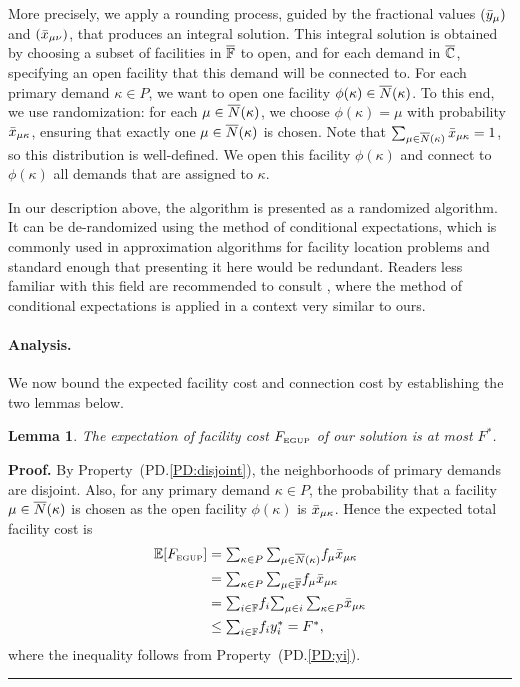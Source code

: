 \documentclass[oneside,final]{ucr}
\newtheorem{lemma}[theorem]{Lemma}
\newenvironment{proof}[1][Proof]{\textbf{#1.} }{\ \rule{0.5em}{0.5em}}
\begin{document}
More precisely, we apply a rounding process, guided by the
fractional values $({\bar y}_{\mu})$ and $({\bar x}_{\mu\nu})$,
that produces an integral solution. This integral solution
is obtained by choosing a subset of facilities in
$\overline{\mathbb{F}}$ to open, and for each demand in $\overline{\mathbb{C}}$,
specifying an open facility that this demand will be
connected to.  For each primary demand $\kappa\in P$, we
want to open one facility $\phi(\kappa) \in
{\overline{N}}(\kappa)$. To this end, we use randomization: for each
$\mu\in{\overline{N}}(\kappa)$, we choose $\phi(\kappa) = \mu$ with
probability ${\bar x}_{\mu\kappa}$, ensuring that exactly one
$\mu \in {\overline{N}}(\kappa)$ is chosen. Note that
$\sum_{\mu\in{\overline{N}}(\kappa)}{\bar x}_{\mu\kappa}=1$, so this
distribution is well-defined.  We open this facility
$\phi(\kappa)$ and connect to $\phi(\kappa)$ all demands
that are assigned to $\kappa$.

In our description above, the algorithm is presented as a
randomized algorithm. It can be de-randomized using the
method of conditional expectations, which is commonly used
in approximation algorithms for facility location problems
and standard enough that presenting it here would be
redundant. Readers less familiar with this field are
recommended to consult \cite{ChudakS04}, where the method of
conditional expectations is applied in a context very
similar to ours.


\paragraph{Analysis.}
We now bound the expected facility cost and connection cost
by establishing the two lemmas below.


\begin{lemma}\label{lemma:3fac}
The expectation of facility cost $F_{\mbox{\tiny\rm EGUP}}$ of our solution is
  at most $F^\ast$.
\end{lemma}

\begin{proof}
  By Property~(PD.\ref{PD:disjoint}), the neighborhoods of
  primary demands are disjoint. Also, for any primary demand
  $\kappa\in P$, the probability that a facility
  $\mu\in{\overline{N}}(\kappa)$ is chosen as the open facility
  $\phi(\kappa)$ is ${\bar x}_{\mu\kappa}$. Hence the expected
  total facility cost is
%
\begin{align*}
    \mathbb{E}[F_{\mbox{\tiny\rm EGUP}}]
	&= \textstyle{\sum_{\kappa\in P}\sum_{\mu\in{\overline{N}}(\kappa)}} f_{\mu} {\bar x}_{\mu\kappa}
	\\
	&= \textstyle{\sum_{\kappa\in P}\sum_{\mu\in\overline{\mathbb{F}}}} f_{\mu} {\bar x}_{\mu\kappa} 
	\\
	&= \textstyle{\sum_{i\in\mathbb{F}}} f_i \textstyle{\sum_{\mu\in i}\sum_{\kappa\in P}} {\bar x}_{\mu\kappa} 
	\\
	&\leq \textstyle{\sum_{i\in\mathbb{F}}} f_i y_i^\ast 
	= F^\ast,
\end{align*}
%
where the inequality follows from Property~(PD.\ref{PD:yi}).
\end{proof}
\end{document}
